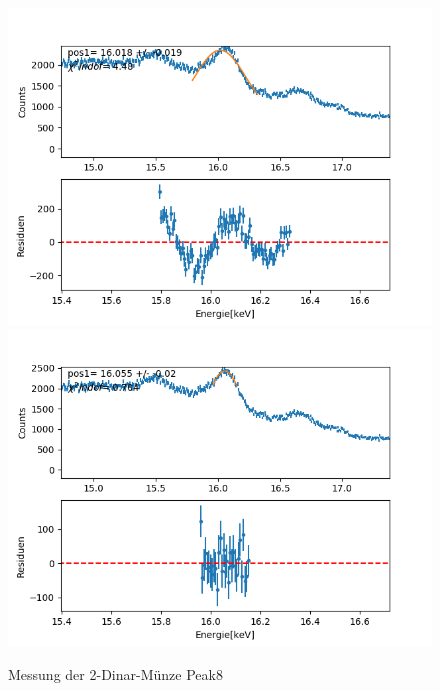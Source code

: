 \documentclass[12pt,a4paper]{article}
\begin{document}
\begin{figure}[H]
\centering
\includegraphics[scale=0.49]{Bilder/roentgen_spektren/denar/den8_1.png}
\includegraphics[scale=0.49]{Bilder/roentgen_spektren/denar/den8_2.png}
\caption{Messung der 2-Dinar-Münze Peak8}
\end{figure}

\newpage
\end{document}
